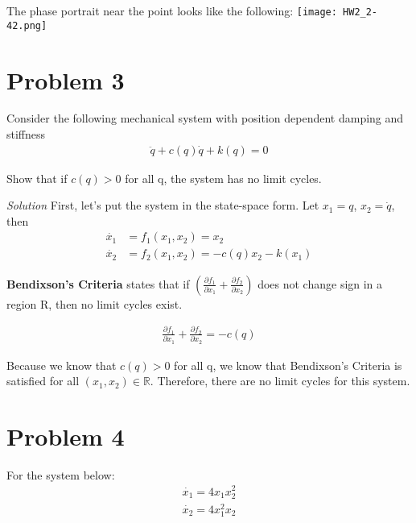 \documentclass{article}
\begin{document}
  The phase portrait near the point looks like the following: \hspace{4mm}
  \texttt{[image: HW2\_2-42.png]} \newpage


  \section{Problem 3}

  Consider the following mechanical system with position dependent damping and
  stiffness
  \begin{align*}
    \ddot{q} + c(q)\dot{q} + k(q) = 0 \tag{3.1}
  \end{align*}

  \noindent Show that if $c(q) > 0$ for all q, the system has no limit cycles. \newline

  \noindent \textit{Solution} \newline \newline
  \indent First, let's put the system in the state-space form. Let $x_1=q$,
  $x_2=\dot{q}$, then
  \begin{align*}
    \dot{x_1} &= f_1(x_1,x_2) = x_2 \tag{3.2} \\
    \dot{x_2} &= f_2(x_1,x_2) =  -c(q)x_2 - k(x_1) \tag{3.2} 
  \end{align*}

  \textbf{Bendixson's Criteria} states that if
  $(\frac{\partial{f_1}}{\partial{x_1}} + \frac{\partial{f_2}}{\partial{x_2}})$
  does not change sign in a region R, then no limit cycles exist.
  
  \begin{align*}
    \frac{\partial{f_1}}{\partial{x_1}} + \frac{\partial{f_2}}{\partial{x_2}} = -c(q) \tag{3.3}
  \end{align*}

  Because we know that $c(q) > 0$ for all q, we know that Bendixson's Criteria is
  satisfied for all \newline $(x_1, x_2) \in \mathbb{R}$. Therefore, there are
  no limit cycles for this system.

  \newpage

  \section{Problem 4}

  For the system below:
  \begin{align*}
    \dot{x_1} = 4x_1x_2^2 \tag{4.1} \\
    \dot{x_2} = 4x_1^2x_2 \tag{4.2} 
  \end{align*}
  
\end{document}
